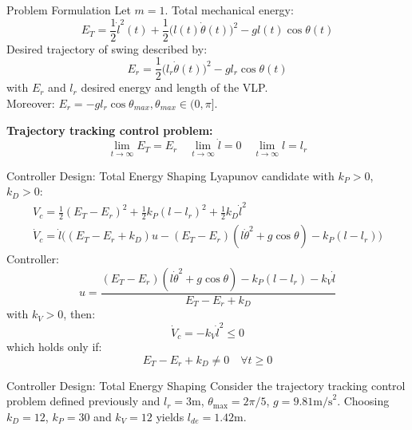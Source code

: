 \documentclass[10pt]{beamer}
\begin{document}
  \begin{frame}{Problem Formulation}
    Let $m=1$. Total mechanical energy:
    \begin{equation*}
      E_T = %
        \frac{1}{2}\dot{l}^2(t)+\frac{1}{2}\big(l(t)\dot{\theta}(t)\big)^2-
        gl(t)\cos\theta(t) 
    \end{equation*}
    Desired trajectory of swing described by:
    \begin{equation*}
      E_r = \frac{1}{2}\big(l_r\dot{\theta}(t)\big)^2-gl_r\cos\theta(t) 
    \end{equation*}
    with $E_r$ and $l_r$ desired energy and length of the VLP.\\Moreover:
    $E_r = -gl_r\cos\theta_{max}, \theta_{max} \in (0,\pi]$.

    \textbf{Trajectory tracking control problem:}
    \begin{equation*}
      \lim_{t\rightarrow \infty} E_T = E_r  \quad
      \lim_{t\rightarrow \infty} \dot{l} = 0 \quad
      \lim_{t\rightarrow \infty} l = l_r
    \end{equation*}
  \end{frame}

  \begin{frame}{Controller Design: Total Energy Shaping}
    Lyapunov candidate with $k_P>0$, $k_D>0$:
    \begin{gather*}
      V_c = \frac{1}{2}(E_T-E_r)^2+\frac{1}{2}k_P(l-l_r)^2+
        \frac{1}{2}k_D\dot{l}^2 \\
      \dot{V}_c = \dot{l}\big((E_T-E_r+k_D)u-(E_T-E_r)(l\dot{\theta}^2+
        g\cos\theta)-k_P(l-l_r) \big)
    \end{gather*}
    Controller:
    \begin{equation*}
      u = \frac{(E_T-E_r)(l\dot{\theta}^2+g\cos\theta)-k_P(l-l_r)-
        k_V\dot{l}}{E_T-E_r+k_D}
    \end{equation*}
    with $k_V>0$, then:
    \begin{equation*}
      \dot{V}_c = -k_V\dot{l}^2 \leq 0
    \end{equation*}
    which holds only if:
    \begin{equation*}
      E_T-E_r+k_D  \neq 0 \quad \forall t\geq 0
    \end{equation*}
  \end{frame}

  \begin{frame}{Controller Design: Total Energy Shaping}
    Consider the trajectory tracking control problem defined previously
    and $l_r=3\text{m}$, $\theta_{\max}=2\pi/5$, $g=9.81\text{m/s}^2$.
    Choosing $k_D=12$, $k_P=30$ and $k_V=12$ yields $l_{de}=1.42\text{m}$.
  \end{frame}
\end{document}
